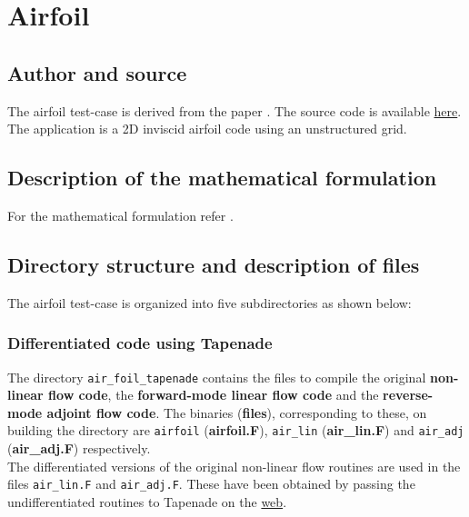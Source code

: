 \section{Airfoil}
\subsection{Author and source}
The airfoil test-case is derived from the paper \cite{Giles_2005}. The source code is available \href{http://people.maths.ox.ac.uk/gilesm/codes/airfoil/bangalore05.tar}{here}. The application is a 2D inviscid airfoil code using an unstructured grid. 
\subsection{Description of the mathematical formulation}
For the mathematical formulation refer \cite{Giles_2005}.

\subsection{Directory structure and description of files}
The airfoil test-case is organized into five subdirectories as shown below:\\
\subsubsection{Differentiated code using Tapenade}
The directory \texttt{air\_foil\_tapenade} contains the files to compile the original \textbf{non-linear flow code}, the \textbf{forward-mode linear flow code} and the \textbf{reverse-mode adjoint flow code}. The binaries (\textbf{files}), corresponding to these, on building the directory are \texttt{airfoil} (\textbf{{airfoil.F}}), \texttt{air\_lin} (\textbf{{air\_lin.F}}) and \texttt{air\_adj} (\textbf{{air\_adj.F}}) respectively. \\

\noindent The differentiated versions of the original non-linear flow routines are used in the files \texttt{air\_lin.F} and \texttt{air\_adj.F}. These have been obtained by passing the undifferentiated routines to Tapenade on the \href{http://www-tapenade.inria.fr:8080/tapenade/index.jsp}{web}. \\


